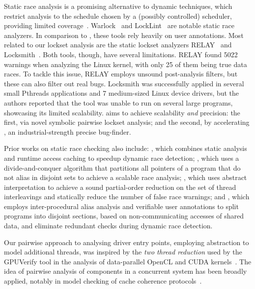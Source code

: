 Static race analysis is a promising alternative to dynamic techniques, which restrict analysis to the schedule chosen by a (possibly controlled) scheduler, providing limited coverage~\cite{musuvathi2008finding}. Warlock~\cite{sterling1993warlock} and LockLint~\cite{oracle2010locklint} are notable static race analyzers.  In comparison to \whoop, these tools rely heavily on user annotations.
%
Most related to our lockset analysis are the static lockset analyzers RELAY~\cite{voung2007relay} and Locksmith~\cite{pratikakis2006locksmith}. Both tools, though, have several limitations. RELAY found 5022 warnings when analyzing the Linux kernel, with only 25 of them being true data races. To tackle this issue, RELAY employs unsound post-analysis filters, but these can also filter out real bugs. Locksmith was successfully applied in several small Pthreads applications and 7 medium-sized Linux device drivers, but the authors reported that the tool was unable to run on several large programs, showcasing its limited scalability. \whoop aims to achieve scalability \emph{and} precision: the first, via novel symbolic pairwise lockset analysis; and the second, by accelerating \corral, an industrial-strength precise bug-finder.

Prior works on static race checking also include: \cite{choi2002efficient}, which combines static analysis and runtime access caching to speedup dynamic race detection; \cite{kahlon2007fast}, which uses a divide-and-conquer algorithm that partitions all pointers of a program that do not alias in disjoint sets to achieve a scalable race analysis; \cite{kahlon2009semantic}, which uses abstract interpretation to achieve a sound partial-order reduction on the set of thread interleavings and statically reduce the number of false race warnings; and \cite{das2015section}, which employs inter-procedural alias analysis and verifiable user annotations to split programs into disjoint sections, based on non-communicating accesses of shared data, and eliminate redundant checks during dynamic race detection.

Our pairwise approach to analysing driver entry points, employing abstraction to model additional threads, was inspired by the \emph{two thread reduction} used by the GPUVerify tool in the analysis of data-parallel OpenCL and CUDA kernels~\cite{gpuverify,bardsley2014engineering}.  The idea of pairwise analysis of components in a concurrent system has been broadly applied, notably in model checking of cache coherence protocols~\cite{mcmillan1999verification}.
